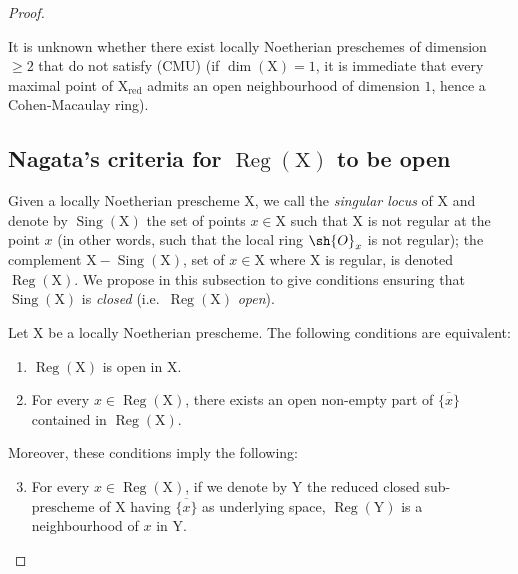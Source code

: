 \begin{proof}
\begin{remarks}[6.11.9]
It is unknown whether there exist locally Noetherian preschemes of dimension $\geqslant 2$ that do not satisfy (CMU)
(if $\dim(\mathrm{X})=1$, it is immediate that every maximal point of $\mathrm{X}_{\mathrm{red}}$ admits an open neighbourhood of dimension $1$,
hence a Cohen-Macaulay ring).
\end{remarks}

\subsection{Nagata's criteria for \texorpdfstring{$\operatorname{Reg}(\mathrm{X})$}{Reg(X)} to be open}
\label{subsection:IV.6.12}

\begin{env}[6.12.1]
\label{IV.6.12.1}
Given a locally Noetherian prescheme $\mathrm{X}$, we call the \emph{singular
locus} of $\mathrm{X}$ and denote by $\operatorname{Sing}(\mathrm{X})$ the set of points $x\in\mathrm{X}$ such that $\mathrm{X}$ is not
regular at the point $x$ (in other words, such that the local ring $\sh{O}_x$ is not regular); the
complement $\mathrm{X}-\operatorname{Sing}(\mathrm{X})$, set of $x\in\mathrm{X}$ where $\mathrm{X}$ is regular, is denoted $\operatorname{Reg}(\mathrm{X})$.
We propose in this subsection to give conditions ensuring that
$\operatorname{Sing}(\mathrm{X})$ is \emph{closed} (i.e.\ $\operatorname{Reg}(\mathrm{X})$ \emph{open}).
\end{env}

\begin{proposition}[6.12.2]
\label{IV.6.12.2}
Let $\mathrm{X}$ be a locally Noetherian prescheme. The following conditions
are equivalent:
\begin{enumerate}[label=\emph{\alph*)}]
  \item $\operatorname{Reg}(\mathrm{X})$ is open in $\mathrm{X}$.
  \item For every $x\in\operatorname{Reg}(\mathrm{X})$, there exists an open non-empty part of $\overline{\{x\}}$ contained in $\operatorname{Reg}(\mathrm{X})$.
\end{enumerate}
Moreover, these conditions imply the following:
\begin{enumerate}[label=\emph{\alph*)}]
\setcounter{enumi}{2}
  \item For every $x\in\operatorname{Reg}(\mathrm{X})$, if we denote by $\mathrm{Y}$ the reduced closed sub-prescheme of $\mathrm{X}$ having $\overline{\{x\}}$
as underlying space, $\operatorname{Reg}(\mathrm{Y})$ is a neighbourhood of $x$ in $\mathrm{Y}$.
\end{enumerate}
\end{proposition}


\end{proof}
